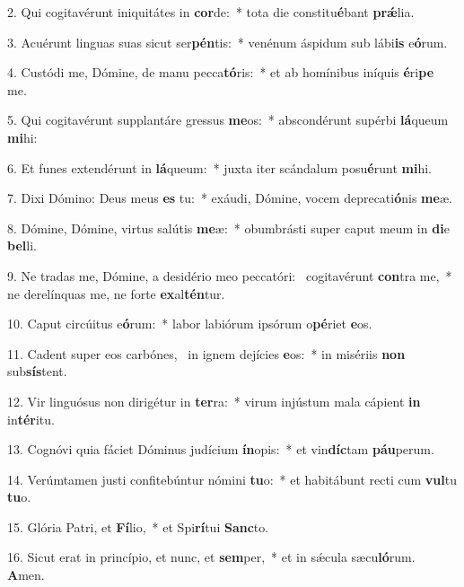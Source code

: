 2. Qui cogitavérunt iniquitátes in \textbf{cor}de:~*  tota die constitu\textbf{é}bant \textbf{prǽ}lia.\

3. Acuérunt linguas suas sicut ser\textbf{pén}tis:~*  venénum áspidum sub lábi\textbf{is} e\textbf{ó}rum.\

4. Custódi me, Dómine, de manu pecca\textbf{tó}ris:~*  et ab homínibus iníquis \textbf{é}ri\textbf{pe} me.\

5. Qui cogitavérunt supplantáre gressus \textbf{me}os:~*  abscondérunt supérbi \textbf{lá}queum \textbf{mi}hi:\

6. Et funes extendérunt in \textbf{lá}queum:~*  juxta iter scándalum posu\textbf{é}runt \textbf{mi}hi.\

7. Dixi Dómino: Deus meus \textbf{es} tu:~*  exáudi, Dómine, vocem deprecati\textbf{ó}nis \textbf{me}æ.\

8. Dómine, Dómine, virtus salútis \textbf{me}æ:~*  obumbrásti super caput meum in \textbf{di}e \textbf{bel}li.\

9. Ne tradas me, Dómine, a desidério meo peccatóri: \dag\  cogitavérunt \textbf{con}tra me,~*  ne derelínquas me, ne forte \textbf{ex}al\textbf{tén}tur.\

10. Caput circúitus e\textbf{ó}rum:~*  labor labiórum ipsórum o\textbf{pé}riet \textbf{e}os.\

11. Cadent super eos carbónes, \dag\  in ignem dejícies \textbf{e}os:~*  in misériis \textbf{non} sub\textbf{sís}tent.\

12. Vir linguósus non dirigétur in \textbf{ter}ra:~*  virum injústum mala cápient \textbf{in} in\textbf{tér}itu.\

13. Cognóvi quia fáciet Dóminus judícium \textbf{ín}opis:~*  et vin\textbf{díc}tam \textbf{páu}perum.\

14. Verúmtamen justi confitebúntur nómini \textbf{tu}o:~*  et habitábunt recti cum \textbf{vul}tu \textbf{tu}o.\

15. Glória Patri, et \textbf{Fí}lio,~*  et Spi\textbf{rí}tui \textbf{Sanc}to.\

16. Sicut erat in princípio, et nunc, et \textbf{sem}per,~*  et in sǽcula sæcu\textbf{ló}rum. \textbf{A}men.\

